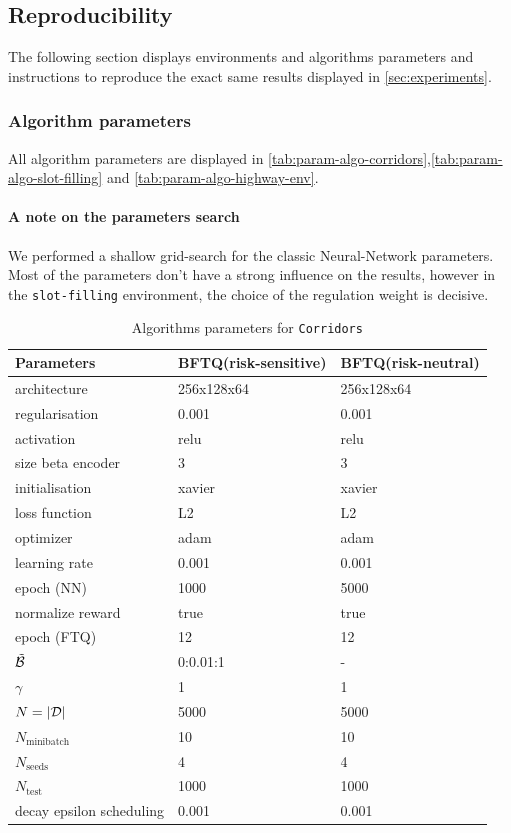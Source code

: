 \begin{subappendices}
\subsection{Reproducibility}
\label{subsec:reproducibility-supp}

The following section displays environments and algorithms parameters and instructions to reproduce the exact same results displayed in \autoref{sec:experiments}.


\subsubsection{Algorithm parameters}
\label{sec:algorithms-parameters}

All algorithm parameters are displayed in \autoref{tab:param-algo-corridors},\autoref{tab:param-algo-slot-filling} and \autoref{tab:param-algo-highway-env}.

\paragraph{A note on the parameters search}

We performed a shallow grid-search for the classic Neural-Network parameters. Most of the parameters don't have a strong influence on the results, however in the \texttt{slot-filling} environment, the choice of the regulation weight is decisive.

\begin{table}[tp]
	\centering
	\begin{tabular}{lll}
		\toprule
		Parameters & BFTQ(risk-sensitive) & BFTQ(risk-neutral)\tabularnewline
		\midrule
		architecture & 256x128x64 & 256x128x64\tabularnewline
		regularisation & 0.001 & 0.001\tabularnewline
		activation & relu & relu\tabularnewline
		size beta encoder & 3 & 3\tabularnewline
		initialisation & xavier & xavier\tabularnewline
		loss function & L2 & L2\tabularnewline
		optimizer & adam & adam\tabularnewline
		learning rate & 0.001 & 0.001\tabularnewline
		epoch (NN) & 1000 & 5000\tabularnewline
		normalize reward & true & true\tabularnewline
		epoch (FTQ) & 12 & 12\tabularnewline
		$\tilde{\mathcal{B}}$ & 0:0.01:1 & -\tabularnewline
		$\gamma$ & 1 & 1\tabularnewline
		$N=|\mathcal{D}|$ & 5000 & 5000\tabularnewline
		$N_\text{minibatch}$ & 10 & 10\tabularnewline
		$N_\text{seeds}$ & 4 & 4\tabularnewline
		$N_\text{test}$ & 1000 & 1000\tabularnewline
		decay epsilon scheduling & 0.001 & 0.001\tabularnewline
		\bottomrule
	\end{tabular}
	\caption{Algorithms parameters for \texttt{Corridors}}
	\label{tab:param-algo-corridors}
\end{table}


\end{subappendices}
